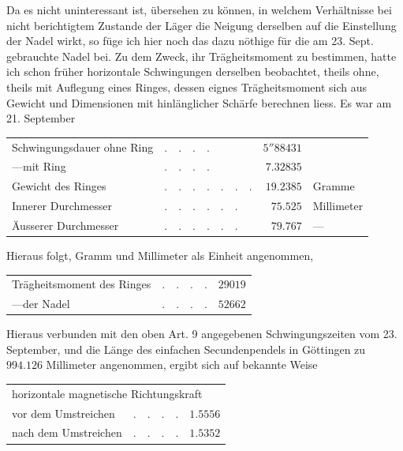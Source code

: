 Da es nicht uninteressant ist, übersehen zu können, in welchem Verhältnisse bei nicht berichtigtem Zustande der Läger die Neigung derselben auf die Einstellung der Nadel wirkt, so füge ich hier noch das dazu nöthige für die am 23. Sept. gebrauchte Nadel bei. Zu dem Zweck, ihr Trägheitsmoment zu bestimmen, hatte ich schon früher horizontale Schwingungen derselben beobachtet, theils ohne, theils mit Auflegung eines Ringes, dessen eignes Trägheitsmoment sich aus Gewicht und Dimensionen mit hinlänglicher Schärfe berechnen liess. Es war am 21. September
\begin{center}
{\fontsize{9}{11}\selectfont
\begin{tabular}{llrl}
Schwingungsdauer ohne Ring&$.\quad.\quad.\quad.$&$5''88431$&\\
\hspace{2em}---\quad mit Ring&$.\quad.\quad.\quad.$&$7.32835$&\\
Gewicht des Ringes&$.\quad.\quad.\quad.\quad.\quad.\quad.$&$19.2385$&Gramme\\
Innerer Durchmesser&$.\quad.\quad.\quad.\quad.\quad.$&$75.525$&Millimeter\\
Äusserer Durchmesser&$.\quad.\quad.\quad.\quad.\quad.$&$79.767$&---
\end{tabular}}
\end{center}

Hieraus folgt, Gramm und Millimeter als Einheit angenommen,
\begin{center}
\begin{tabular}{llr}
Trägheitsmoment des Ringes&$.\quad.\quad.\quad.$&$29019$\\
\hspace{2em}---\quad der Nadel\footnotemark&$.\quad.\quad.\quad.$&$52662$
\end{tabular}
\end{center}


Hieraus verbunden mit den oben Art. 9 angegebenen Schwingungszeiten vom 23. September, und die Länge des einfachen Secundenpendels in Göttingen zu $994.126$ Millimeter angenommen, ergibt sich auf bekannte Weise
\begin{center}
\begin{tabular}{llr}
\multicolumn{3}{l}{horizontale magnetische Richtungskraft}\\
\quad vor dem Umstreichen&$.\quad.\quad.\quad.$&$1.5556$\\
\quad nach dem Umstreichen&$.\quad.\quad.\quad.$&$1.5352$
\end{tabular}
\end{center}

